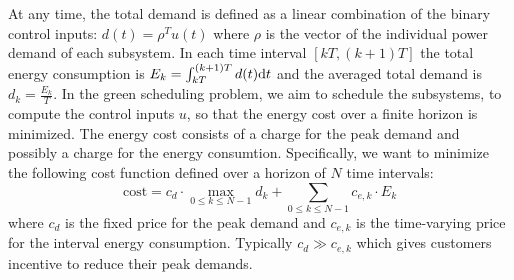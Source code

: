At any time, the total demand is defined as a linear combination of the binary
control inputs: $d (t) = \rho^T u (t)$ where $\rho$ is the vector of the individual
power demand of each subsystem. In each time interval $[kT, (k + 1) T]$ the
total energy consumption is $E_k = \int_{kT}^{(k + 1) T} d (t) \mathrm{d} t$ and
the averaged total demand is $d_k = \frac{E_k}{T}$. 
In the green scheduling problem, we aim to schedule
the subsystems, \ie to compute the control inputs $u$, so that the energy cost over a finite horizon is minimized.
The energy cost consists of a charge for the peak demand and possibly a charge for the energy
consumtion.
Specifically, we want to minimize the following cost function defined over a horizon of $N$ time intervals:
\begin{equation}
  \label{eq:cost-function} \text{cost} = c_d \cdot \max_{0 \leqslant k
  \leqslant N - 1} d_k + \textstyle\sum_{0 \leqslant k \leqslant N - 1} c_{e, k} \cdot
  E_k
\end{equation}
where $c_d$ is the fixed price for the peak demand and $c_{e, k}$ is the
time-varying price for the interval energy consumption.
Typically $c_d \gg c_{e, k}$ which gives customers incentive to reduce their peak demands.


